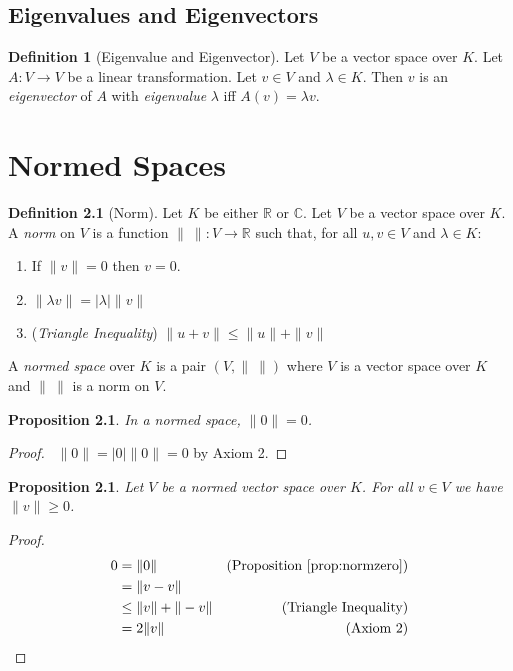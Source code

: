 \documentclass{book}
\let\qed\relax
\newtheorem{prop}[ax]{Proposition}
\theoremstyle{definition}
\newtheorem{df}[ax]{Definition}
\begin{document}
\section{Eigenvalues and Eigenvectors}

\begin{df}[Eigenvalue and Eigenvector]
Let $V$ be a vector space over $K$. Let $A : V \rightarrow V$ be a linear transformation. Let $v \in V$ and $\lambda \in K$. Then $v$ is an \emph{eigenvector} of $A$ with \emph{eigenvalue} $\lambda$ iff $A(v) = \lambda v$.
\end{df}

\chapter{Normed Spaces}

\begin{df}[Norm]
Let $K$ be either $\mathbb{R}$ or $\mathbb{C}$. Let $V$ be a vector space over $K$. A \emph{norm} on $V$ is a function $\|\ \| : V \rightarrow \mathbb{R}$ such that, for all $u,v \in V$ and $\lambda \in K$:
\begin{enumerate}
\item If $\|v\| = 0$ then $v = 0$.
\item $\| \lambda v\| = |\lambda| \|v\|$
\item (\emph{Triangle Inequality}) $\|u + v\| \leq \|u\| + \|v\|$
\end{enumerate}
A \emph{normed space} over $K$ is a pair $(V, \|\ \|)$ where $V$ is a vector space over $K$ and $\|\ \|$ is a norm on $V$.
\end{df}

\begin{prop}
\label{prop:normzero}
In a normed space, $\|0\| = 0$.
\end{prop}

\begin{proof}
\pf\ $\|0\| = |0| \|0\| = 0$ by Axiom 2. \qed
\end{proof}

\begin{prop}
\label{prop:normnonnegative}
Let $V$ be a normed vector space over $K$. For all $v \in V$ we have $\| v \| \geq 0$.
\end{prop}

\begin{proof}
\pf
\begin{align*}
0 & = \|0\| & (\text{Proposition \ref{prop:normzero}}) \\
& = \| v - v\| \\
& \leq \|v\| + \|-v\| & (\text{Triangle Inequality}) \\
& = 2\|v\| & (\text{Axiom 2})
\end{align*}
\end{proof}
\end{document}
